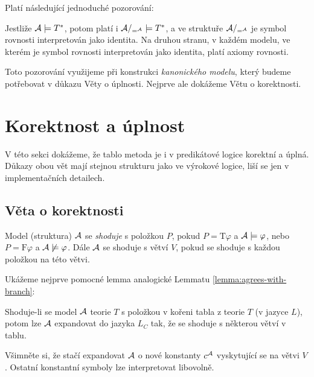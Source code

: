 Platí následující jednoduché pozorování:
\begin{observation}
    Jestliže $\mathcal{A}\models T^*$, potom platí i $\mathcal{A}/_{=^{\mathcal{A}}}\models T^*$, a ve struktuře $\mathcal{A}/_{=^{\mathcal{A}}}$ je symbol rovnosti interpretován jako identita. Na druhou stranu, v každém modelu, ve kterém je symbol rovnosti interpretován jako identita, platí axiomy rovnosti.
\end{observation}

Toto pozorování využijeme při konstrukci \emph{kanonického modelu}, který budeme potřebovat v důkazu Věty o úplnosti. Nejprve ale dokážeme Větu o korektnosti.

\section{Korektnost a úplnost}

V této sekci dokážeme, že tablo metoda je i v predikátové logice korektní a úplná. Důkazy obou vět mají stejnou strukturu jako ve výrokové logice, liší se jen v implementačních detailech.

\subsection{Věta o korektnosti}

Model (struktura) $\mathcal{A}$ se \emph{shoduje} s položkou $P$, pokud
$P=\mathrm{T}\varphi$ a $\mathcal{A}\models\varphi$, nebo $P=\mathrm{F}\varphi$ a $\mathcal{A}\not\models\varphi$. Dále $\mathcal{A}$ se shoduje s větví $V$, pokud se shoduje s každou položkou na této větvi.

Ukážeme nejprve pomocné lemma analogické Lemmatu \ref{lemma:agrees-with-branch}:
\begin{lemma}\label{lemma:agrees-with-branch}
    Shoduje-li se model $\mathcal{A}$ teorie $T$ s položkou v kořeni tabla z teorie $T$ (v jazyce $L$), potom lze $\mathcal{A}$ expandovat do jazyka $L_C$ tak, že se shoduje s některou větví v tablu.
\end{lemma}
Všimněte si, že stačí expandovat $\mathcal{A}$ o nové konstanty $c^{\mathcal{A}}$ vyskytující se na větvi $V$. Ostatní konstantní symboly lze interpretovat libovolně.

